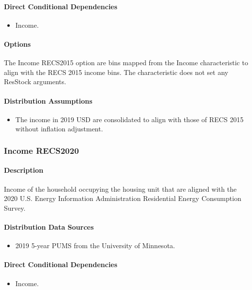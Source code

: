 \paragraph{Direct Conditional Dependencies}
\begin{itemize}
    \item Income.
\end{itemize}

\paragraph{Options}
The Income RECS2015 option are bins mapped from the Income characteristic to align with the RECS 2015 income bins. The characteristic does not set any ResStock arguments.

\paragraph{Distribution Assumptions}
\begin{itemize}
\item
  The income in 2019 USD are consolidated to align with those of RECS 2015 without inflation adjustment.
\end{itemize}

\subsubsection{Income RECS2020}\label{income_recs2020}
\paragraph{Description}
Income of the household occupying the housing unit that are aligned
with the 2020 U.S. Energy Information Administration Residential Energy
Consumption Survey.

\paragraph{Distribution Data Sources}
\begin{itemize} 
\item
  2019 5-year PUMS from the University of Minnesota.
\end{itemize}

\paragraph{Direct Conditional Dependencies}
\begin{itemize}
    \item Income.
\end{itemize}

